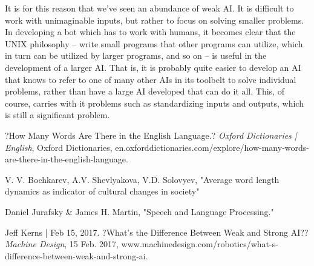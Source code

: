 \documentclass{article}
\begin{document}
        It is for this reason that we've seen an abundance of weak AI\cite{weakAI}. It is difficult to work with unimaginable inputs, but rather to focus on 
solving smaller problems. In developing a bot which has to work with humans, it becomes clear that the UNIX philosophy -- write small programs that other 
programs can utilize, which in turn can be utilized by larger programs, and so on -- is useful in the development of a larger AI. That is, it is probably quite 
easier to develop an AI that knows to refer to one of many other AIs in its toolbelt to solve individual problems, rather than have a large AI developed that 
can do it all. This, of course, carries with it problems such as standardizing inputs and outputs, which is still a significant problem.


\newpage

\begin{thebibliography}{6}

?How Many Words Are There in the English Language.? \textit{Oxford Dictionaries | English}, Oxford Dictionaries, 
en.oxforddictionaries.com/explore/how-many-words-are-there-in-the-english-language. 

V. V.  Bochkarev, A.V. Shevlyakova, V.D. Solovyev, "Average word length dynamics as indicator of cultural changes in society"

Daniel Jurafsky & James H. Martin, "Speech and Language Processing."

Jeff Kerns | Feb 15, 2017. ?What's the Difference Between Weak and Strong AI?? \textit{Machine Design}, 15 Feb. 2017, 
www.machinedesign.com/robotics/what-s-difference-between-weak-and-strong-ai. 

\end{thebibliography}
\end{document}
